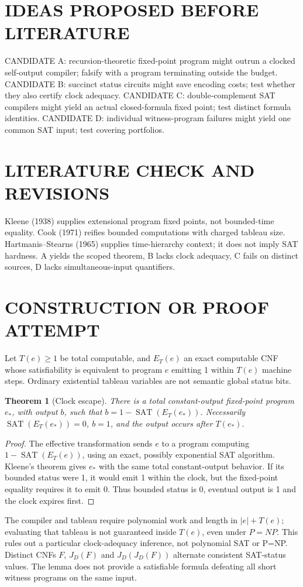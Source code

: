 \documentclass{article}
\newtheorem{theorem}{Theorem}
\begin{document}
\section{IDEAS PROPOSED BEFORE LITERATURE}
CANDIDATE A: recursion-theoretic fixed-point program might outrun a clocked self-output compiler; falsify with a program terminating outside the budget. CANDIDATE B: succinct status circuits might save encoding costs; test whether they also certify clock adequacy. CANDIDATE C: double-complement SAT compilers might yield an actual closed-formula fixed point; test distinct formula identities. CANDIDATE D: individual witness-program failures might yield one common SAT input; test covering portfolios. 
\section{LITERATURE CHECK AND REVISIONS}
Kleene (1938) supplies extensional program fixed points, not bounded-time equality. Cook (1971) reifies bounded computations with charged tableau size. Hartmanis--Stearns (1965) supplies time-hierarchy context; it does not imply SAT hardness. A yields the scoped theorem, B lacks clock adequacy, C fails on distinct sources, D lacks simultaneous-input quantifiers.
\section{CONSTRUCTION OR PROOF ATTEMPT}
Let $T(e)\ge1$ be total computable, and $E_T(e)$ an exact computable CNF whose satisfiability is equivalent to program $e$ emitting 1 within $T(e)$ machine steps. Ordinary existential tableau variables are not semantic global status bits.
\begin{theorem}[Clock escape]
There is a total constant-output fixed-point program $e_*$, with output $b$, such that $b=1-\operatorname{SAT}(E_T(e_*))$. Necessarily $\operatorname{SAT}(E_T(e_*))=0$, $b=1$, and the output occurs after $T(e_*)$.
\end{theorem}
\begin{proof}
The effective transformation sends $e$ to a program computing $1-\operatorname{SAT}(E_T(e))$, using an exact, possibly exponential SAT algorithm. Kleene's theorem gives $e_*$ with the same total constant-output behavior. If its bounded status were 1, it would emit 1 within the clock, but the fixed-point equality requires it to emit 0. Thus bounded status is 0, eventual output is 1 and the clock expires first.
\end{proof}
The compiler and tableau require polynomial work and length in $|e|+T(e)$; evaluating that tableau is not guaranteed inside $T(e)$, even under $P=NP$. This rules out a particular clock-adequacy inference, not polynomial SAT or P=NP. Distinct CNFs $F$, $J_D(F)$ and $J_D(J_D(F))$ alternate consistent SAT-status values. The lemma does not provide a satisfiable formula defeating all short witness programs on the same input.
\end{document}
